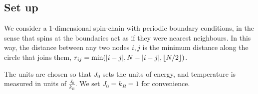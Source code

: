 %

\subsection{Set up}%
\label{sub:Set up}

We consider a 1-dimensional spin-chain with periodic boundary conditions, in the sense that spins at the boundaries act as if they were nearest neighbours. In this way, the distance between any two nodes $i, j$ is the minimum distance along the circle that joins them, $r_{ij} = \min(\lvert i - j \rvert,N - \lvert i - j \rvert, \lfloor N/2 \rfloor)$.

The units are chosen so that $J_0$ sets the units of energy, and temperature is measured in units of $\frac{J_0}{k_B}$. We set $J_0 = k_B = 1$ for convenience. 
